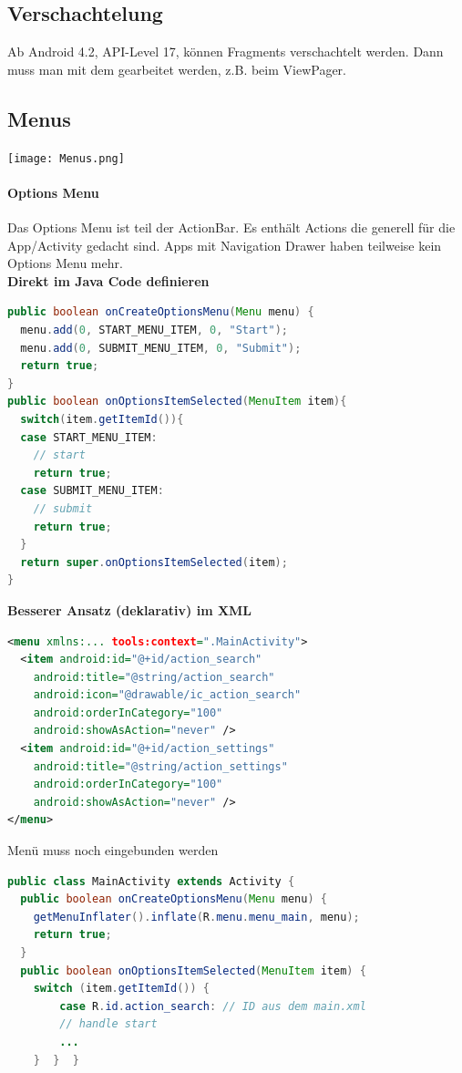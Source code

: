 \subsection{Verschachtelung}
Ab Android 4.2, API-Level 17, können Fragments verschachtelt werden. Dann muss man mit dem  gearbeitet werden, z.B. beim ViewPager.

\subsection{Menus}
\texttt{[image: Menus.png]}
\paragraph{Options Menu} Das Options Menu ist teil der ActionBar. Es enthält Actions die generell für die App/Activity gedacht sind. Apps mit Navigation Drawer haben teilweise kein Options Menu mehr. \\
\textbf{Direkt im Java Code definieren}
\begin{lstlisting}[language=java]
public boolean onCreateOptionsMenu(Menu menu) {
  menu.add(0, START_MENU_ITEM, 0, "Start");
  menu.add(0, SUBMIT_MENU_ITEM, 0, "Submit");
  return true;
}
public boolean onOptionsItemSelected(MenuItem item){
  switch(item.getItemId()){
  case START_MENU_ITEM:
    // start
    return true;
  case SUBMIT_MENU_ITEM:
    // submit
    return true;
  }
  return super.onOptionsItemSelected(item);
}
\end{lstlisting}
\textbf{Besserer Ansatz (deklarativ) im XML
}\begin{lstlisting}[language=xml]
<menu xmlns:... tools:context=".MainActivity">
  <item android:id="@+id/action_search"
    android:title="@string/action_search"
    android:icon="@drawable/ic_action_search"
    android:orderInCategory="100"
    android:showAsAction="never" />
  <item android:id="@+id/action_settings"
    android:title="@string/action_settings"
    android:orderInCategory="100"
    android:showAsAction="never" />
</menu>
\end{lstlisting}
Menü muss noch eingebunden werden
\begin{lstlisting}[language=java]
public class MainActivity extends Activity {
  public boolean onCreateOptionsMenu(Menu menu) {
    getMenuInflater().inflate(R.menu.menu_main, menu);
    return true;
  }
  public boolean onOptionsItemSelected(MenuItem item) {
    switch (item.getItemId()) {
        case R.id.action_search: // ID aus dem main.xml
        // handle start
        ...
    }  }  }
\end{lstlisting}


